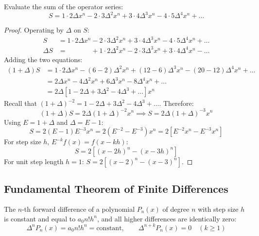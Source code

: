 \documentclass[11pt,a4paper]{article}
\begin{document}
\begin{theorembox}
Evaluate the sum of the operator series:
\begin{equation}
    S = 1 \cdot 2 \Delta x^n - 2 \cdot 3 \Delta^2 x^n + 3 \cdot 4 \Delta^3 x^n - 4 \cdot 5 \Delta^4 x^n + \dots
\end{equation}
\end{theorembox}
\begin{proof}
Operating by $\Delta$ on $S$:
\begin{align*}
    S &= 1 \cdot 2 \Delta x^n - 2 \cdot 3 \Delta^2 x^n + 3 \cdot 4 \Delta^3 x^n - 4 \cdot 5 \Delta^4 x^n + \dots \\
    \Delta S &= \phantom{1 \cdot 2 \Delta x^n} + 1 \cdot 2 \Delta^2 x^n - 2 \cdot 3 \Delta^3 x^n + 3 \cdot 4 \Delta^4 x^n - \dots
\end{align*}
Adding the two equations:
\begin{align*}
    (1 + \Delta)S &= 1 \cdot 2 \Delta x^n - (6 - 2)\Delta^2 x^n + (12 - 6)\Delta^3 x^n - (20 - 12)\Delta^4 x^n + \dots \\
    &= 2\Delta x^n - 4\Delta^2 x^n + 6\Delta^3 x^n - 8\Delta^4 x^n + \dots \\
    &= 2\Delta \left[ 1 - 2\Delta + 3\Delta^2 - 4\Delta^3 + \dots \right] x^n
\end{align*}
Recall that $(1 + \Delta)^{-2} = 1 - 2\Delta + 3\Delta^2 - 4\Delta^3 + \dots$. Therefore:
$$(1 + \Delta)S = 2\Delta (1 + \Delta)^{-2} x^n \implies S = 2\Delta (1 + \Delta)^{-3} x^n$$
Using $E = 1 + \Delta$ and $\Delta = E - 1$:
$$S = 2(E - 1)E^{-3} x^n = 2(E^{-2} - E^{-3}) x^n = 2\left[ E^{-2} x^n - E^{-3} x^n \right]$$
For step size $h$, $E^{-k} f(x) = f(x - kh)$:
\begin{equation}
    \boxed{S = 2\left[ (x - 2h)^n - (x - 3h)^n \right]}
\end{equation}
For unit step length $h = 1$: $S = 2\left[(x - 2)^n - (x - 3)^n\right]$.
\end{proof}

\subsection{Fundamental Theorem of Finite Differences}
\begin{theorembox}
The $n$-th forward difference of a polynomial $P_n(x)$ of degree $n$ with step size $h$ is constant and equal to $a_0 n! h^n$, and all higher differences are identically zero:
\begin{equation}
    \Delta^n P_n(x) = a_0 n! h^n = \text{constant}, \qquad \Delta^{n+k} P_n(x) = 0 \quad (k \ge 1)
\end{equation}
\end{theorembox}
\end{document}

